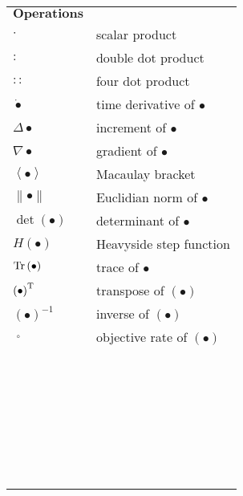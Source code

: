 \begin{table}[htb]
  \centering
    \begin{tabular}{p{3cm}p{10.5cm}}
    $\textbf{Operations}$ & \\
    $\cdot$  & scalar product \\
    $:$  & double dot product \\
    $::$  & four dot product \\
    ${\dot  \bullet }$  & time derivative of $\bullet$ \\
    ${\Delta  \bullet }$  & increment of $\bullet$ \\
    $\nabla \bullet$  & gradient of $\bullet$ \\
    $\left\langle  \bullet  \right\rangle$  & Macaulay bracket \\
    $\left\|  \bullet  \right\|$  & Euclidian norm of $\bullet$ \\
    $\det \left(  \bullet  \right)$  & determinant of $\bullet$ \\
    $H\left(  \bullet  \right)$  & Heavyside step function \\
    $\rm{Tr}\left(  \bullet  \right)$  & trace of $\bullet$ \\
    ${\left(  \bullet  \right)^{\rm T}}$  & transpose of $\left(  \bullet  \right)$ \\
    ${\left(  \bullet  \right)^{ - 1}}$  & inverse of $\left(  \bullet  \right)$ \\
    $\mathop {\left(  \bullet  \right)}\limits^ \circ$  & objective rate of $\left(  \bullet  \right)$ \\
    & \\
    & \\
    & \\
    & \\
    & \\
    & \\
    & \\
    & \\
    & \\
    & \\
    & \\
    & \\
    & \\
    & \\
    & \\
    & \\
    & \\
    & \\
    & \\
    & \\
    & \\
    & \\
    & \\
    & \\
    & \\
    & \\
    & \\
    & \\
    & \\
    \end{tabular}%
  \label{Tab:operations}%
\end{table}%
\renewcommand\arraystretch{1.0}
